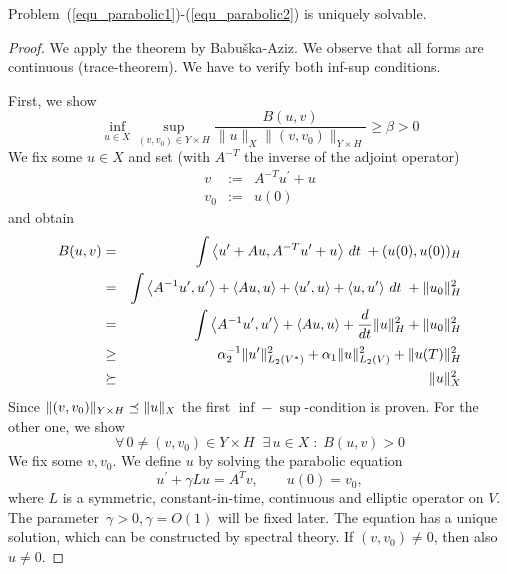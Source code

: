 \begin{theorem}[Lions] \label{theo_continuous} Problem~(\ref{equ_parabolic1})-(\ref{equ_parabolic2}) is uniquely solvable.
\end{theorem}
\begin{proof}
We apply the theorem by Babu\v{s}ka-Aziz. We observe that all forms are continuous (trace-theorem). 
We have to verify both inf-sup conditions.

First, we show
\begin{equation}
\inf_{u \in X} \sup_{ (v,v_0) \in Y \times H} \frac{B(u,v)} {\| u \|_X  \| (v,v_0) \|_{Y \times H}}  \geq \beta > 0
\end{equation}
We fix some $u \in X$ and set (with $A^{-T}$ the inverse of the adjoint operator)
\begin{eqnarray*}
v &  := & A^{-T} u^\prime + u \\
v_0 & := & u(0)
\end{eqnarray*}
and obtain
\begin{eqnarray*}
B(u,v) & = & \int \left< u^\prime + A u, A^{-T} u^\prime + u \right> \, dt \; + (u(0), u(0))_H \\
& = & \int \left<A^{-1} u^\prime, u^\prime \right> + \left< A u, u \right> + \left< u^\prime, u \right> + \left< u, u^\prime \right> \, dt \;  + \| u_0 \|_H^2 \\
& = & \int \left<A^{-1} u^\prime, u^\prime \right> + \left< A u, u \right> + \frac{d}{dt} \| u \|_H^2  + \| u_0 \|_H^2 \\
& \geq & \alpha_2^{-1}  \| u^\prime \|^2_{L_2(V^\ast)} + \alpha_1 \| u \|^2_{L_2(V)} + \| u(T) \|_H^2 \\
& \succeq &  \| u \|_X^2
\end{eqnarray*}
Since $\| (v,v_0) \|_{Y \times H} \preceq \| u \|_X$ the first $\inf-\sup$-condition is proven.
For the other one, we show
\begin{equation}
\forall \, 0 \neq (v,v_0) \in Y \times H \; \; \exists \, u \in X  \;  : \;  B(u,v) > 0
\end{equation}
We fix some $v, v_0$. We define $u$ by solving the parabolic equation
$$
u^\prime + \gamma L u = A^T v, \qquad u(0) = v_0,
$$
where $L$ is a symmetric, constant-in-time, continuous and elliptic operator on $V$. 
The parameter~$\gamma > 0, \gamma = O(1)$ will be fixed later. The equation has a unique solution, which can be constructed by spectral theory.
If $(v,v_0) \neq 0$, then also $u \neq 0$.


\end{proof}
